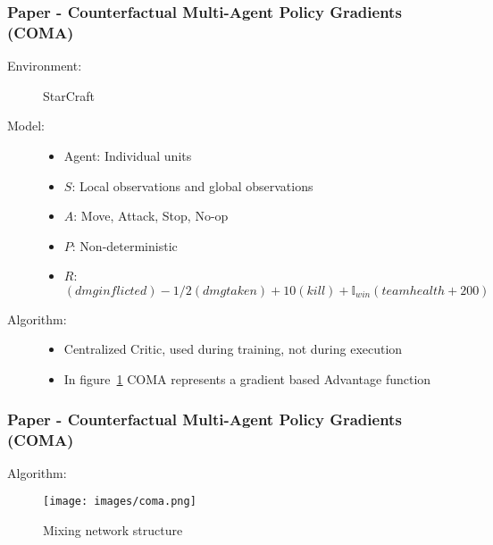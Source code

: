 \documentclass{beamer}
\begin{document}
\begin{frame} %
    \frametitle{Paper \thepapercounter - Counterfactual Multi-Agent Policy Gradients (COMA)
    }
    \begin{description}
        \item[Environment:] StarCraft
        \item[Model:]
        \begin{itemize}
            \item Agent: Individual units
            \item $S$: Local observations and global observations
            \item $A$: Move, Attack, Stop, No-op
            \item $P$: Non-deterministic
            \item $R$: $(dmg inflicted) - 1/2(dmg taken) + 10(kill) 
            + \mathbb{I}_{win}(team health + 200)$
        \end{itemize}
        \item[Algorithm:] 
        \begin{itemize}
            \item Centralized Critic, used during training, not during execution
            \item In figure~\ref{fig:COMA} COMA represents a gradient based Advantage function
        \end{itemize}
    \end{description}
\end{frame}

\begin{frame} %
    \frametitle{Paper \thepapercounter - Counterfactual Multi-Agent Policy Gradients (COMA)
    \cite{foerster2018}}
    \begin{description}
        \item[Algorithm:] 
    \end{description}
    \begin{figure}\small
        \texttt{[image: images/coma.png]}
        \caption{Mixing network structure\cite{foerster2018}}
        \label{fig:COMA}
    \end{figure}
\end{frame}
\end{document}
